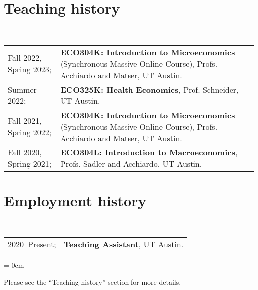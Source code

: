 \documentclass[a4paper, 10pt]{article}
\begin{document}
  \section{Teaching history}
  ~\begin{tabular}{l p{12cm}}
    Fall 2022, Spring 2023; & \textbf{ECO304K: Introduction to Microeconomics} (Synchronous Massive Online Course), Profs. Acchiardo and Mateer, UT Austin.\\
    Summer 2022; & \textbf{ECO325K: Health Economics}, Prof. Schneider, UT Austin.\\
    Fall 2021, Spring 2022; & \textbf{ECO304K: Introduction to Microeconomics} (Synchronous Massive Online Course), Profs. Acchiardo and Mateer, UT Austin.\\
    Fall 2020, Spring 2021; & \textbf{ECO304L: Introduction to Macroeconomics}, Profs. Sadler and Acchiardo, UT Austin.\\
  \end{tabular}
  \vspace*{-0.5em}

  \section{Employment history}
  ~\begin{tabular}{ll}
    2020--Present; & \textbf{Teaching Assistant}, UT Austin.
  \end{tabular}
  \begin{compactitem}\parskip = 0cm
    \item Please see the ``Teaching history'' section for more details.
  \end{compactitem}
  \vspace*{1.25em}
\end{document}
